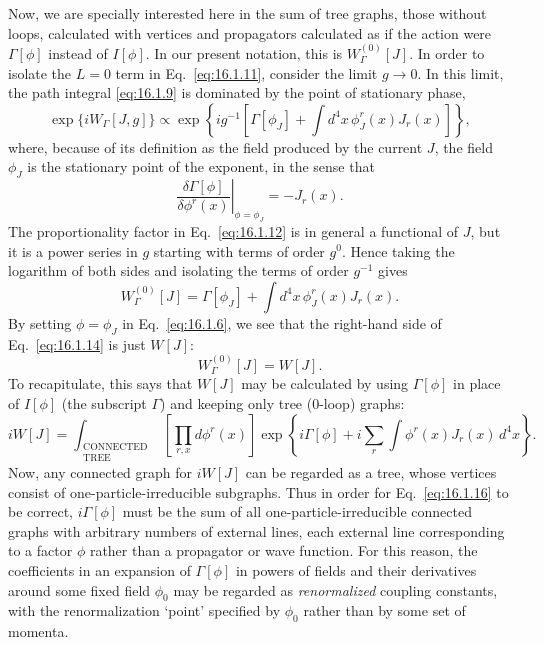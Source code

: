 Now, we are specially interested here in the sum of tree graphs, those
without loops, calculated with vertices and propagators calculated as if
the action were $\Gamma[\phi]$ instead of $I[\phi]$. In our present notation, this is
$W_\Gamma^{(0)}[J]$. In order to isolate the $L=0$ term in Eq.\ \eqref{eq:16.1.11}, consider the
limit $g\to0$. In this limit, the path integral \eqref{eq:16.1.9} is dominated by the
point of stationary phase,
\begin{equation}
\exp\{iW_\Gamma[J,g]\}\propto
\exp\!\left\{ig^{-1}\left[\Gamma[\phi_J]+\int d^4x\,\phi_J^r(x)J_r(x)\right]\right\},
\label{eq:16.1.12}
\end{equation}
where, because of its definition as the field produced by the current $J$, the
field $\phi_J$ is the stationary point of the exponent, in the sense that
\begin{equation}
\left.\frac{\delta\Gamma[\phi]}{\delta\phi^r(x)}\right|_{\phi=\phi_J}=-J_r(x).
\label{eq:16.1.13}
\end{equation}
The proportionality factor in Eq.\ \eqref{eq:16.1.12} is in general a functional of $J$,
but it is a power series in $g$ starting with terms of order $g^0$. Hence taking
the logarithm of both sides and isolating the terms of order $g^{-1}$ gives
\begin{equation}
W_\Gamma^{(0)}[J]=\Gamma[\phi_J]+\int d^4x\,\phi_J^r(x)J_r(x).
\label{eq:16.1.14}
\end{equation}
By setting $\phi=\phi_J$ in Eq.\ \eqref{eq:16.1.6}, we see that the right-hand side of
Eq.\ \eqref{eq:16.1.14} is just $W[J]$:
\begin{equation}
W_\Gamma^{(0)}[J]=W[J].
\label{eq:16.1.15}
\end{equation}
To recapitulate, this says that $W[J]$ may be calculated by using $\Gamma[\phi]$ in
place of $I[\phi]$ (the subscript $\Gamma$) and keeping only tree (0-loop) graphs:
\begin{equation}
iW[J]=\int_{\substack{\mathrm{CONNECTED}\\\mathrm{TREE}}}
\left[\prod_{r,x}d\phi^r(x)\right]
\exp\!\left\{i\Gamma[\phi]+i\sum_r\int\phi^r(x)J_r(x)\,d^4x\right\}.
\label{eq:16.1.16}
\end{equation}
Now, any connected graph for $iW[J]$ can be regarded as a tree, whose
vertices consist of one-particle-irreducible subgraphs. Thus in order for
Eq.\ \eqref{eq:16.1.16} to be correct, $i\Gamma[\phi]$ must be the sum of all
one-particle-irreducible connected graphs with arbitrary numbers of external lines,
each external line corresponding to a factor $\phi$ rather than a propagator
or wave function. For this reason, the coefficients in an expansion of $\Gamma[\phi]$
in powers of fields and their derivatives around some fixed field $\phi_0$ may
be regarded as \emph{renormalized} coupling constants, with the renormalization
`point' specified by $\phi_0$ rather than by some set of momenta.


